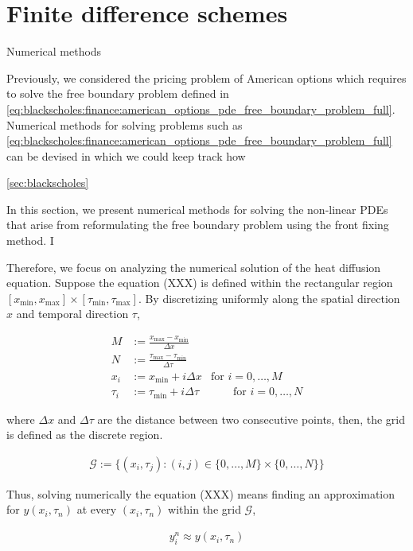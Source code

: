 
\section{Finite difference schemes}

Numerical methods 


Previously, we considered the pricing problem of American options which requires
to solve the free boundary problem defined in 
\eqref{eq:blackscholes:finance:american_options_pde_free_boundary_problem_full}. 
Numerical methods for solving problems such as 
\eqref{eq:blackscholes:finance:american_options_pde_free_boundary_problem_full}
can be devised in which we could keep track how 

\ref{sec:blackscholes}

In this section, we present numerical methods for solving the non-linear PDEs that
arise from reformulating the free boundary problem using the front fixing method.
I


Therefore, we focus on analyzing the numerical solution of the heat diffusion equation. 
Suppose the equation (XXX) is defined within the rectangular region $[x_{\text{min}}, x_{\text{max}}]\times[\tau_{\text{min}}, \tau_{\text{max}}]$.
By discretizing uniformly along the spatial direction $x$ and temporal direction $\tau$,

\begin{align}
  M &:= \frac{x_{\text{max}} - x_{\text{min}}}{\Delta x} \\ 
  N &:= \frac{\tau_{\text{max}} - \tau_{\text{min}}}{\Delta \tau} \\ 
  x_i &:= x_{\text{min}} + i\Delta x & \text{for $i = 0,\dots, M$} \\
  \tau_i &:= \tau_{\text{min}} + i{\Delta \tau} & \qquad \text{for $i = 0,\dots, N$}
\end{align}

where $\Delta x$ and $\Delta \tau$ are the distance between two consecutive points,
then, the grid is defined as the discrete region. 

\begin{align}
  \mathcal{G} := \{(x_i, \tau_j): (i, j) \in \{0,\dots,M\}\times\{0,\dots,N\}\}
\end{align}

Thus, solving numerically the equation (XXX) means finding an approximation for $y(x_i, \tau_n)$ at every 
$(x_i, \tau_n)$ within the grid $\mathcal{G}$,

\begin{align}
  y^{n}_i \approx y(x_i,\tau_n)
\end{align}

